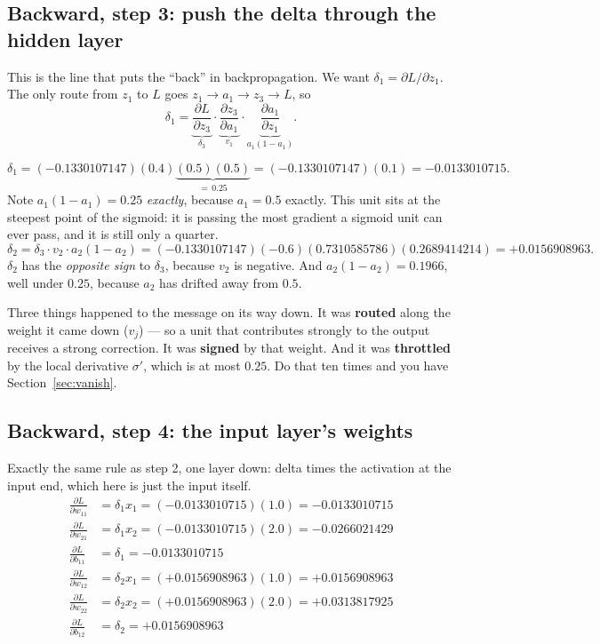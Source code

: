 \documentclass[11pt]{article}
\begin{document}
\subsection{Backward, step 3: push the delta through the hidden layer}
\label{sec:recursion}

This is the line that puts the ``back'' in backpropagation. We want
$\delta_1 = \partial L / \partial z_1$. The only route from $z_1$ to $L$ goes
$z_1 \to a_1 \to z_3 \to L$, so
\[
  \delta_1
  = \underbrace{\frac{\partial L}{\partial z_3}}_{\delta_3}
    \cdot \underbrace{\frac{\partial z_3}{\partial a_1}}_{v_1}
    \cdot \underbrace{\frac{\partial a_1}{\partial z_1}}_{a_1(1-a_1)}.
\]

\begin{worked}
\[
  \delta_1 = (-0.1330107147)(0.4)\underbrace{(0.5)(0.5)}_{=\,0.25}
  = (-0.1330107147)(0.1) = \mathbf{-0.0133010715}.
\]
Note $a_1(1-a_1) = 0.25$ \emph{exactly}, because $a_1 = 0.5$ exactly. This
unit sits at the steepest point of the sigmoid: it is passing the most
gradient a sigmoid unit can ever pass, and it is still only a quarter.
\[
  \delta_2 = \delta_3 \cdot v_2 \cdot a_2(1-a_2)
  = (-0.1330107147)(-0.6)(0.7310585786)(0.2689414214)
  = \mathbf{+0.0156908963}.
\]
$\delta_2$ has the \emph{opposite sign} to $\delta_3$, because $v_2$ is
negative. And $a_2(1-a_2) = 0.1966$, well under $0.25$, because $a_2$ has
drifted away from $0.5$.
\end{worked}

Three things happened to the message on its way down. It was
\textbf{routed} along the weight it came down ($v_j$) --- so a unit that
contributes strongly to the output receives a strong correction. It was
\textbf{signed} by that weight. And it was \textbf{throttled} by the local
derivative $\sigma'$, which is at most $0.25$. Do that ten times and you have
Section~\ref{sec:vanish}.

\subsection{Backward, step 4: the input layer's weights}

Exactly the same rule as step 2, one layer down: delta times the activation at
the input end, which here is just the input itself.
\begin{align}
  \frac{\partial L}{\partial w_{11}} &= \delta_1 x_1
    = (-0.0133010715)(1.0) = \mathbf{-0.0133010715}\\
  \frac{\partial L}{\partial w_{21}} &= \delta_1 x_2
    = (-0.0133010715)(2.0) = \mathbf{-0.0266021429}\\
  \frac{\partial L}{\partial b_{11}} &= \delta_1
    = \mathbf{-0.0133010715}\\
  \frac{\partial L}{\partial w_{12}} &= \delta_2 x_1
    = (+0.0156908963)(1.0) = \mathbf{+0.0156908963}\\
  \frac{\partial L}{\partial w_{22}} &= \delta_2 x_2
    = (+0.0156908963)(2.0) = \mathbf{+0.0313817925}\\
  \frac{\partial L}{\partial b_{12}} &= \delta_2
    = \mathbf{+0.0156908963}
\end{align}
\end{document}
